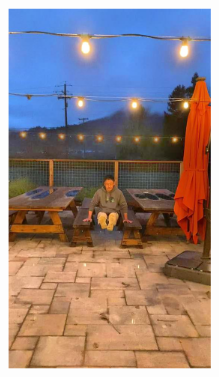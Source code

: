 \documentclass[letterpaper,12pt]{article}
\begin{document}
\begin{figure}[htbp]
\begin{subfigure}{0.128\textwidth}
			\includegraphics[width=\linewidth]{LoLi-Phone-imgT_1/LightenNet}
			\captionsetup{font=scriptsize}
			\caption{}
			\label{fig: LoLi-Phone-imgT_1_c}  
		\end{subfigure}
		\begin{subfigure}{0.128\textwidth}

\end{subfigure}
\end{figure}
\end{document}
